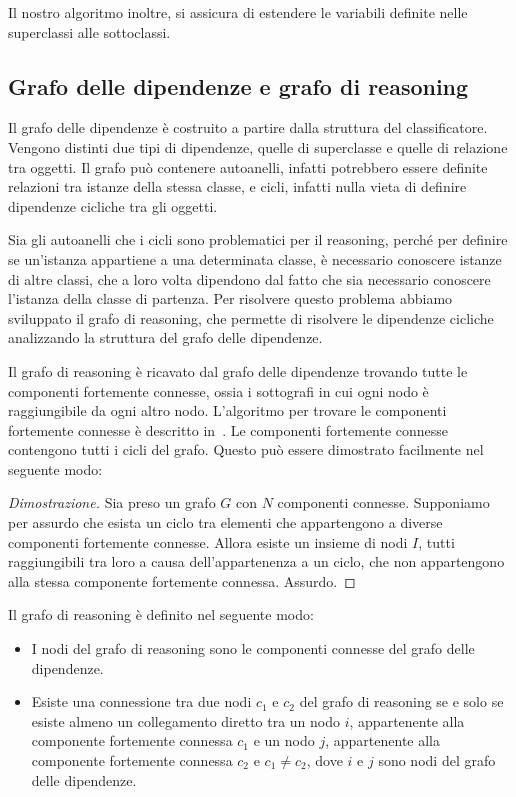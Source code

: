 Il nostro algoritmo inoltre, si assicura di estendere le variabili definite nelle superclassi alle sottoclassi.

\subsection{Grafo delle dipendenze e grafo di reasoning}

Il grafo delle dipendenze è costruito a partire dalla struttura del classificatore. Vengono distinti due tipi di dipendenze, quelle di superclasse e quelle di relazione tra oggetti. Il grafo può contenere autoanelli, infatti potrebbero essere definite relazioni tra istanze della stessa classe, e cicli, infatti nulla vieta di definire dipendenze cicliche tra gli oggetti.

Sia gli autoanelli che i cicli sono problematici per il reasoning, perché per definire se un'istanza appartiene a una determinata classe, è necessario conoscere istanze di altre classi, che a loro volta dipendono dal fatto che sia necessario conoscere l'istanza della classe di partenza. Per risolvere questo problema abbiamo sviluppato il grafo di reasoning, che permette di risolvere le dipendenze cicliche analizzando la struttura del grafo delle dipendenze.

Il grafo di reasoning è ricavato dal grafo delle dipendenze trovando tutte le componenti fortemente connesse, ossia i sottografi in cui ogni nodo è raggiungibile da ogni altro nodo. L'algoritmo per trovare le componenti fortemente connesse è descritto in~\cite{Tarjan72depthfirst}.
Le componenti fortemente connesse contengono tutti i cicli del grafo. Questo può essere dimostrato facilmente nel seguente modo:

\begin{proof}[Dimostrazione]
Sia preso un grafo $G$ con $N$ componenti connesse.
Supponiamo per assurdo che esista un ciclo tra elementi che appartengono a diverse componenti fortemente connesse.
Allora esiste un insieme di nodi $I$, tutti raggiungibili tra loro a causa dell'appartenenza a un ciclo, che non appartengono alla stessa componente fortemente connessa. Assurdo.
\end{proof}

Il grafo di reasoning è definito nel seguente modo:

\begin{itemize}
 \item I nodi del grafo di reasoning sono le componenti connesse del grafo delle dipendenze.
 \item Esiste una connessione tra due nodi $c_1$ e $c_2$ del grafo di reasoning  se e solo se esiste almeno un collegamento diretto tra un nodo $i$, appartenente alla componente fortemente connessa $c_1$ e un nodo $j$, appartenente alla componente fortemente connessa $c_2$ e $c_1\neq c_2$, dove $i$ e $j$ sono nodi del grafo delle dipendenze.
\end{itemize}

